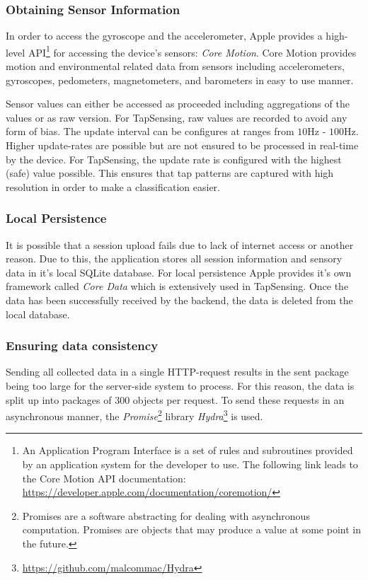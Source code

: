 \subsubsection{Obtaining Sensor Information}
In order to access the gyroscope and the accelerometer, Apple provides a high-level API\footnote{An Application Program Interface is a set of rules and subroutines provided by an application system for the developer to use. The following link leads to the Core Motion API documentation: \url{https://developer.apple.com/documentation/coremotion/} } for accessing the device's sensors: \textit{Core Motion}. Core Motion provides motion and environmental related data from sensors including accelerometers, gyroscopes, pedometers, magnetometers, and barometers in easy to use manner.

Sensor values can either be accessed as proceeded including aggregations of the values or as raw version. For TapSensing, raw values are recorded to avoid any form of bias. The update interval can be configures at ranges from $10$Hz - $100$Hz. Higher update-rates are possible but are not ensured to be processed in real-time by the device. For TapSensing, the update rate is configured with the highest (safe) value possible. This ensures that tap patterns are captured with high resolution in order to make a classification easier.
\subsubsection{Local Persistence}
It is possible that a session upload fails due to lack of internet access or another reason. Due to this, the application stores all session information and sensory data in it's local SQLite database. For local persistence Apple provides it's own framework called \textit{Core Data} which is extensively used in TapSensing. Once the data has been successfully received by the backend, the data is deleted from the local database.
\subsubsection{Ensuring data consistency}
Sending all collected data in a single HTTP-request results in the sent package being too large for the server-side system to process. For this reason, the data is split up into packages of 300 objects per request. To send these requests in an asynchronous manner, the \textit{Promise}\footnote{Promises are a software abstracting for dealing with asynchronous computation. Promises are objects that may produce a value at some point in the future.}\cite{Liskov:1988:PLS:53990.54016} library \textit{Hydra}\footnote{\url{https://github.com/malcommac/Hydra}} is used.


